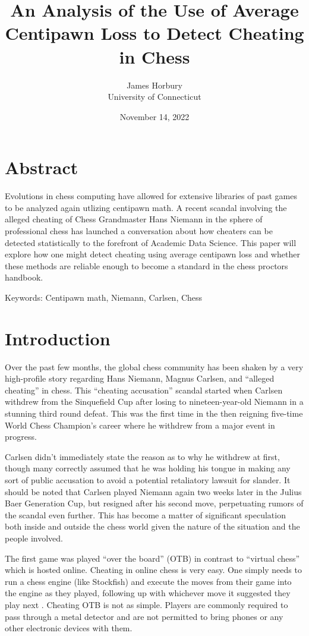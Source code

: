 \documentclass[12pt]{article}
\title{An Analysis of the Use of Average Centipawn Loss to Detect Cheating in Chess}
\author{James Horbury\\
    University of Connecticut
}
\date{November 14, 2022}
\begin{document}
\maketitle

\section*{Abstract}
\label{sec:abs}

Evolutions in chess computing have allowed for extensive libraries of past games to be analyzed again utlizing centipawn math. A recent scandal involving the alleged cheating of Chess Grandmaster Hans Niemann in the sphere of professional chess has launched a conversation about how cheaters can be detected statistically to the forefront of Academic Data Science. This paper will explore how one might detect cheating using average centipawn loss and whether these methods are reliable enough to become a standard in the chess proctors handbook.

Keywords: Centipawn math, Niemann, Carlsen, Chess

\section*{Introduction}
\label{sec:intro}

Over the past few months, the global chess community has been shaken by a very high-profile story regarding Hans Niemann, Magnus Carlsen, and “alleged cheating” in chess. This “cheating accusation” scandal started when Carlsen withdrew from the Sinquefield Cup after losing to nineteen-year-old Niemann in a stunning third round defeat. This was the first time in the then reigning five-time World Chess Champion's career where he withdrew from a major event in progress.

Carlsen didn't immediately state the reason as to why he withdrew at first, though many correctly assumed that he was holding his tongue in making any sort of public accusation to avoid a potential retaliatory lawsuit for slander. It should be noted that Carlsen played Niemann again two weeks later in the Julius Baer Generation Cup, but resigned after his second move, perpetuating rumors of the scandal even further. This has become a matter of significant speculation both inside and outside the chess world given the nature of the situation and the people involved. 

The first game was played “over the board” (OTB) in contrast to “virtual chess” which is hosted online. Cheating in online chess is very easy. One simply needs to run a chess engine (like Stockfish) and execute the moves from their game into the engine as they played, following up with whichever move it suggested they play next \citep{kenregan2010}. Cheating OTB is not as simple. Players are commonly required to pass through a metal detector and are not permitted to bring phones or any other electronic devices with them.
\end{document}
